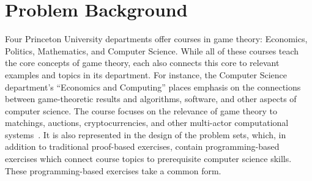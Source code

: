 \documentclass[pageno]{jpaper}
\begin{document}
\section*{Problem Background}
Four Princeton University departments offer courses in game theory: Economics, Politics, Mathematics, and Computer Science.
While all of these courses teach the core concepts of game theory, each also connects this core to relevant examples and topics in its department.
For instance, the Computer Science department's ``Economics and Computing'' places emphasis on the connections between game-theoretic results and algorithms, software, and other aspects of computer science.
The course focuses on the relevance of game theory to matchings, auctions, cryptocurrencies, and other multi-actor computational systems~\cite{cos445sp18}.
It is also represented in the design of the problem sets, which, in addition to traditional proof-based exercises, contain programming-based exercises which connect course topics to prerequisite computer science skills.
These programming-based exercises take a common form.
\end{document}
